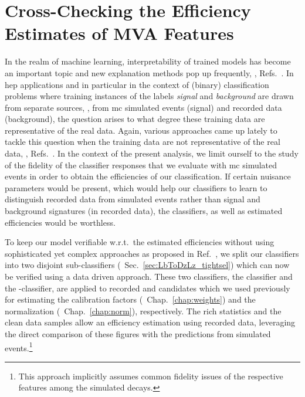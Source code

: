 \chapter{Cross-Checking the Efficiency Estimates of MVA Features}
\label{chap:apdx_mva_xcheck}
In the realm of machine learning, interpretability of trained models has become an important topic and new explanation methods pop up frequently, \eg{}, Refs.~\cite{nnexplain1,nnexplain2,nnexplain3}.
In \gls{hep} applications and in particular in the context of (binary) classification problems where training instances of the labels \textit{signal} and \textit{background} are drawn from separate sources, \ie{}, from \gls{mc} simulated events (signal) and recorded data (background), the question arises to what degree these training data are representative of the real data.
Again, various approaches came up lately to tackle this question
when the training data are not representative of the real data, \eg{}, Refs.~\cite{nnexplain_hep1,nnexplain_hep2}.
In the context of the present analysis, we limit ourself to the study of the fidelity of the classifier responses that we evaluate with \gls{mc} simulated events in order to obtain the efficiencies of our classification.
If certain nuisance parameters would be present, which would help our classifiers to learn to distinguish recorded data from simulated events rather than signal and background signatures (in recorded data), the classifiers, as well as estimated efficiencies would be worthless.

To keep our model verifiable w.r.t.\ the estimated efficiencies without using sophisticated yet complex approaches as proposed in Ref.~\cite{nnexplain_hep1}, we split our classifiers into two disjoint sub-classifiers (\cf{}~Sec.~\ref{sec:LbToDzLz_tightsel}) which can now be verified using a data driven approach.
These two classifiers, the \Lz classifier and the \Lb-\Dz classifier, are applied to recorded \decay{\Lb}{\jpsi\Lz} and \decay{\Lb}{\Dz\proton\pim} candidates which we used previously for estimating the calibration factors (\cf{}~Chap.~\ref{chap:weights}) and the normalization (\cf{}~Chap.~\ref{chap:norm}), respectively.
The rich statistics and the clean data samples allow an efficiency estimation using recorded data, leveraging the direct comparison of these figures with the predictions from simulated events.\footnote{This approach implicitly assumes common fidelity issues of the respective features among the simulated \Lb decays.}

